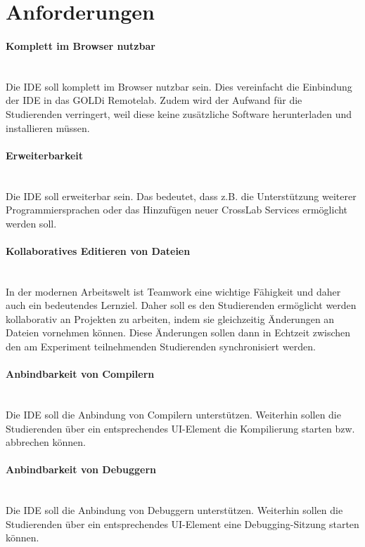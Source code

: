 \section{Anforderungen} \label{anforderungen}

\paragraph{Komplett im Browser nutzbar} \mbox{} \\
Die IDE soll komplett im Browser nutzbar sein. Dies vereinfacht die Einbindung der IDE in das GOLDi Remotelab. Zudem wird der Aufwand für die Studierenden verringert, weil diese keine zusätzliche Software herunterladen und installieren müssen.

\paragraph{Erweiterbarkeit} \mbox{} \\
Die IDE soll erweiterbar sein. Das bedeutet, dass z.B. die Unterstützung weiterer Programmiersprachen oder das Hinzufügen neuer CrossLab Services ermöglicht werden soll.

\paragraph{Kollaboratives Editieren von Dateien} \mbox{} \\
In der modernen Arbeitswelt ist Teamwork eine wichtige Fähigkeit und daher auch ein bedeutendes Lernziel. Daher soll es den Studierenden ermöglicht werden kollaborativ an Projekten zu arbeiten, indem sie gleichzeitig Änderungen an Dateien vornehmen können. Diese Änderungen sollen dann in Echtzeit zwischen den am Experiment teilnehmenden Studierenden synchronisiert werden.

\paragraph{Anbindbarkeit von Compilern} \mbox{} \\
Die IDE soll die Anbindung von Compilern unterstützen. Weiterhin sollen die Studierenden über ein entsprechendes UI-Element die Kompilierung starten bzw. abbrechen können.

\paragraph{Anbindbarkeit von Debuggern} \mbox{} \\
Die IDE soll die Anbindung von Debuggern unterstützen. Weiterhin sollen die Studierenden über ein entsprechendes UI-Element eine Debugging-Sitzung starten können. 

